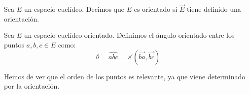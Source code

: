 \begin{definicion}
    Sea $E$ un espacio euclídeo. Decimos que $E$ es orientado si $\vec{E}$ tiene definido una orientación.
\end{definicion}


\begin{definicion}
    Sea $E$ un espacio euclídeo orientado. Definimos el ángulo orientado entre los puntos $a,b,c\in E$ como:
    \begin{equation*}
        \theta = \hat{abc} = \measuredangle (\vec{ba},\vec{bc})
    \end{equation*}
    \begin{figure}[H]
        \centering
    \end{figure}

    Hemos de ver que el orden de los puntos es relevante, ya que viene determinado por la orientación.
\end{definicion}

